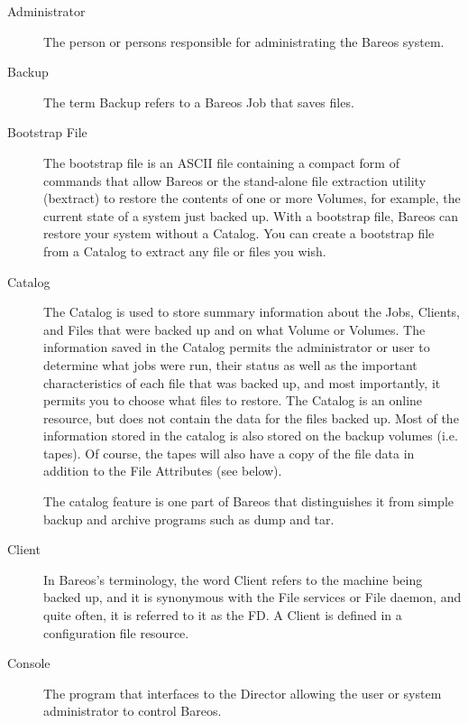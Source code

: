 \begin{description}

\item [Administrator]
   The person or persons responsible for administrating the Bareos system.

\item [Backup]
   The term Backup refers to a Bareos Job that saves files.

\item [Bootstrap File]
   The bootstrap file is an ASCII file containing a compact form of
   commands that allow Bareos or the stand-alone file extraction utility
   (bextract) to restore the contents of one or more Volumes, for
   example, the current state of a system just backed up.  With a bootstrap
   file, Bareos can restore your system without a Catalog.  You can create
   a bootstrap file from a Catalog to extract any file or files you wish.

\item [Catalog]
   The Catalog is used to store summary information about the Jobs,
   Clients, and Files that were backed up and on what Volume or Volumes.
   The information saved in the Catalog permits the administrator or user
   to determine what jobs were run, their status as well as the important
   characteristics of each file that was backed up, and most importantly,
   it permits you to choose what files to restore.
   The Catalog is an
   online resource, but does not contain the data for the files backed up.
   Most of the information stored in the catalog is also stored on the
   backup volumes (i.e.  tapes).  Of course, the tapes will also have a
   copy of the file data in addition to the File Attributes (see below).

   The catalog feature is one part of Bareos that distinguishes it from
   simple backup and archive programs such as dump and tar.

\item [Client]
   In Bareos's terminology, the word Client refers to the machine being
   backed up, and it is synonymous with the File services or File daemon,
   and quite often, it is referred to it as the FD. A Client is defined in a
   configuration file resource.

\item [Console]
   The program that interfaces to the Director allowing  the user or system
   administrator to control Bareos.


\end{description}
